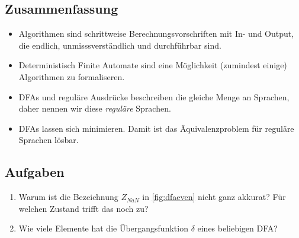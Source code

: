 \subsection*{Zusammenfassung}
\begin{itemize}
    \item Algorithmen sind schrittweise Berechnungsvorschriften mit In- und Output,
        die endlich, unmisssverständlich und durchführbar sind.
    \item Deterministisch Finite Automate sind eine Möglichkeit (zumindest einige)
        Algorithmen zu formaliseren.
    \item DFAs und reguläre Ausdrücke beschreiben die gleiche Menge an Sprachen,
        daher nennen wir diese \emph{reguläre} Sprachen.
    \item DFAs lassen sich minimieren.
        Damit ist das Äquivalenzproblem für reguläre Sprachen lösbar.
\end{itemize}

\subsection*{Aufgaben}

\begin{enumerate}
    \item Warum ist die Bezeichnung $Z_{NaN}$ in \autoref{fig:dfaeven} nicht ganz akkurat?
          Für welchen Zustand trifft das noch zu?
    \item Wie viele Elemente hat die Übergangsfunktion $\delta$ eines beliebigen DFA?
\end{enumerate}
